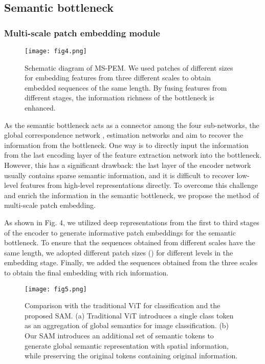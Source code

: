 \documentclass[lettersize,journal]{IEEEtran}
\begin{document}
\subsection{Semantic bottleneck}
\subsubsection{Multi-scale patch embedding module}

 \begin{figure}[t]\centering
\texttt{[image: fig4.png]}
\caption{Schematic diagram of MS-PEM. We used patches of different sizes for embedding features from three different scales to obtain embedded sequences of the same length. By fusing features from different stages, the information richness of the bottleneck is enhanced.}
\label{FIG0}
\end{figure}

As the semantic bottleneck acts as a connector among the four sub-networks, the global correspondence network , estimation networks  and  aim to recover the information from the bottleneck. One way is to directly input the information from the last encoding layer of the feature extraction network  into the bottleneck. However, this has a significant drawback: the last layer of the encoder network usually contains sparse semantic information, and it is difficult to recover low-level features from high-level representations directly. To overcome this challenge and enrich the information in the semantic bottleneck, we propose the method of multi-scale patch embedding.

As shown in Fig. 4, we utilized deep representations from the first to third stages of the encoder  to generate informative patch embeddings for the semantic bottleneck. To ensure that the sequences obtained from different scales have the same length, we adopted different patch sizes () for different levels in the embedding stage. Finally, we added the sequences obtained from the three scales to obtain the final embedding with rich information.



 \begin{figure}[t]\centering
\texttt{[image: fig5.png]}
\caption{Comparison with the traditional ViT for classification and the proposed SAM. (a) Traditional ViT\cite{r29} introduces a single class token as an aggregation of global semantics for image classification. (b) Our SAM introduces an additional set of semantic tokens to generate global semantic representation with spatial information, while preserving the original tokens containing original information.}
\label{FIG0}
\end{figure}
\end{document}
